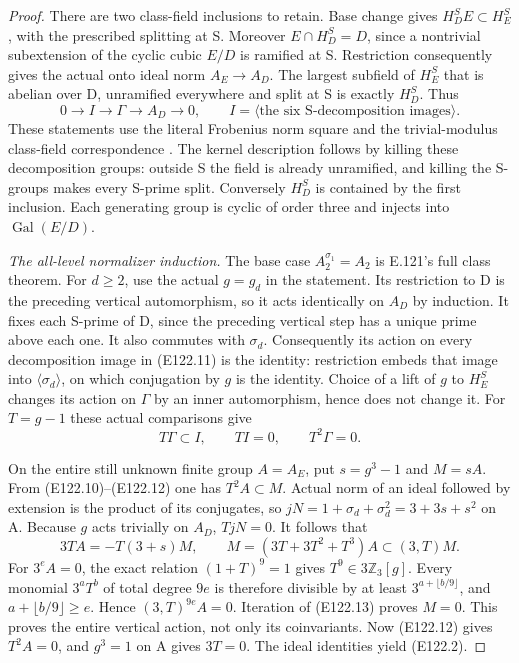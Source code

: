 \begin{proof}
There are two class-field inclusions to retain. Base change gives
$H_D^S E\subset H_E^S$, with the prescribed splitting at S.
Moreover $E\cap H_D^S=D$, since a nontrivial subextension of the
cyclic cubic $E/D$ is ramified at S. Restriction consequently gives
the actual onto ideal norm $A_E\to A_D$. The largest subfield of
$H_E^S$ that is abelian over D, unramified everywhere and split at S
is exactly $H_D^S$. Thus
\[
 0\longrightarrow I\longrightarrow\Gamma
       \longrightarrow A_D\longrightarrow0,
 \qquad
 I=\langle\text{the six S-decomposition images}\rangle.
 \tag{E122.11}
\]
These statements use the literal Frobenius norm square and the
trivial-modulus class-field correspondence
\cite[V,Proposition3.3, Theorem3.6 and Example3.9]{E_MilneCFT}.
The kernel description follows by killing these decomposition
groups: outside S the field is already unramified, and killing
the S-groups makes every S-prime split. Conversely $H_D^S$ is
contained by the first inclusion. Each generating group is cyclic
of order three and injects into $\operatorname{Gal}(E/D)$.

\emph{The all-level normalizer induction.}
The base case $A_2^{\sigma_1}=A_2$ is E.121's full class theorem.
For $d\ge2$, use the actual $g=g_d$ in the statement. Its restriction
to D is the preceding vertical automorphism, so it acts identically
on $A_D$ by induction. It fixes each S-prime of D, since the preceding
vertical step has a unique prime above each one. It also commutes
with $\sigma_d$. Consequently its action on every decomposition
image in (E122.11) is the identity: restriction embeds that image
into $\langle\sigma_d\rangle$, on which conjugation by $g$ is
the identity. Choice of a lift of $g$ to $H_E^S$ changes its action
on $\Gamma$ by an inner automorphism, hence does not change it.
For $T=g-1$ these actual comparisons give
\[
          T\Gamma\subset I,\qquad TI=0,\qquad T^2\Gamma=0.
 \tag{E122.12}
\]

On the entire still unknown finite group $A=A_E$, put
$s=g^3-1$ and $M=sA$. From (E122.10)--(E122.12) one has
$T^2A\subset M$. Actual norm of an ideal followed by extension is
the product of its conjugates, so
$jN=1+\sigma_d+\sigma_d^2=3+3s+s^2$ on A.
Because $g$ acts trivially on $A_D$, $TjN=0$. It follows that
\[
       3TA=-T(3+s)M,\qquad
       M=(3T+3T^2+T^3)A\subset(3,T)M.
 \tag{E122.13}
\]
For $3^eA=0$, the exact relation $(1+T)^9=1$ gives
$T^9\in3\mathbb Z_3[g]$. Every monomial $3^aT^b$ of total degree
$9e$ is therefore divisible by at least $3^{a+\lfloor b/9\rfloor}$,
and $a+\lfloor b/9\rfloor\ge e$. Hence $(3,T)^{9e}A=0$.
Iteration of (E122.13) proves $M=0$. This proves the entire vertical
action, not only its coinvariants. Now (E122.12) gives $T^2A=0$,
and $g^3=1$ on A gives $3T=0$. The ideal identities yield (E122.2).


\end{proof}
